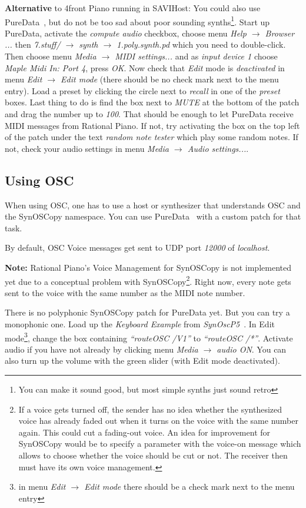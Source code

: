 \documentclass[12pt,a4paper,titlepage,oneside]{report}
\begin{document}
\textbf{Alternative} to 4front Piano running in SAVIHost: You could also use PureData~\cite{bib:puredata}, but do not be too sad about poor sounding synths\footnote{You can make it sound good, but most simple synths just sound retro}. Start up PureData, activate the \emph{compute audio} checkbox, choose menu \emph{Help $\rightarrow$ Browser ...} then \emph{7.stuff/ $\rightarrow$ synth $\rightarrow$ 1.poly.synth.pd} which you need to double-click. Then choose menu \emph{Media $\rightarrow$ MIDI settings...} and as \emph{input device 1} choose \emph{Maple Midi In: Port 4}, press \emph{OK}. Now check that \emph{Edit} mode is \emph{deactivated} in menu \emph{Edit $\rightarrow$ Edit mode} (there should be no check mark next to the menu entry). Load a preset by clicking the circle next to \emph{recall} in one of the \emph{preset} boxes. Last thing to do is find the box next to \emph{MUTE} at the bottom of the patch and drag the number up to \emph{100}. That should be enough to let PureData receive MIDI messages from Rational Piano. If not, try activating the box on the top left of the patch under the text \emph{random note tester} which play some random notes. If not, check your audio settings in menu \emph{Media $\rightarrow$ Audio settings...}.


\subsection{Using OSC}

When using OSC, one has to use a host or synthesizer that understands OSC and the SynOSCopy namespace. You can use PureData~\cite{bib:puredata} with a custom patch for that task.

By default, OSC Voice messages get sent to UDP port \emph{12000} of \emph{localhost}.

\textbf{Note:} Rational Piano's Voice Management for SynOSCopy is not implemented yet due to a conceptual problem with SynOSCopy\footnote{If a voice gets turned off, the sender has no idea whether the synthesized voice has already faded out when it turns on the voice with the same number again. This could cut a fading-out voice. An idea for improvement for SynOSCopy would be to specify a parameter with the voice-on message which allows to choose whether the voice should be cut or not. The receiver then must have its own voice management.}. Right now, every note gets sent to the voice with the same number as the MIDI note number.

There is no polyphonic SynOSCopy patch for PureData yet. But you can try a monophonic one. Load up the \emph{Keyboard Example} from \emph{SynOscP5}~\cite{bib:synoscopy_keyboard_example}. In Edit mode\footnote{in menu \emph{Edit $\rightarrow$ Edit mode} there should be a check mark next to the menu entry}, change the box containing \emph{``routeOSC /V1''} to \emph{``routeOSC /*''}. Activate audio if you have not already by clicking menu \emph{Media $\rightarrow$ audio ON}. You can also turn up the volume with the green slider (with Edit mode deactivated).
\end{document}
